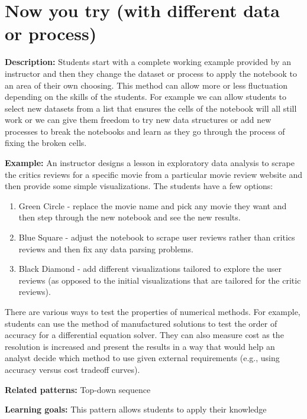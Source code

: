 \documentclass[]{book}
\providecommand{\tightlist}{%
  \setlength{\itemsep}{0pt}\setlength{\parskip}{0pt}}
\begin{document}
\section{Now you try (with different data or
process)}\label{now-you-try-with-different-data-or-process}

\textbf{Description:} Students start with a complete working example
provided by an instructor and then they change the dataset or process to
apply the notebook to an area of their own choosing. This method can
allow more or less fluctuation depending on the skills of the students.
For example we can allow students to select new datasets from a list
that ensures the cells of the notebook will all still work or we can
give them freedom to try new data structures or add new processes to
break the notebooks and learn as they go through the process of fixing
the broken cells.

\textbf{Example:} An instructor designs a lesson in exploratory data
analysis to scrape the critics reviews for a specific movie from a
particular movie review website and then provide some simple
visualizations. The students have a few options:

\begin{enumerate}
\def\labelenumi{\arabic{enumi}.}
\tightlist
\item
  Green Circle - replace the movie name and pick any movie they want and
  then step through the new notebook and see the new results.
\item
  Blue Square - adjust the notebook to scrape user reviews rather than
  critics reviews and then fix any data parsing problems.
\item
  Black Diamond - add different visualizations tailored to explore the
  user reviews (as opposed to the initial visualizations that are
  tailored for the critic reviews).
\end{enumerate}

There are various ways to test the properties of numerical methods. For
example, students can use the method of manufactured solutions to test
the order of accuracy for a differential equation solver. They can also
measure cost as the resolution is increased and present the results in a
way that would help an analyst decide which method to use given external
requirements (e.g., using accuracy versus cost tradeoff curves).

\textbf{Related patterns:} Top-down sequence

\textbf{Learning goals:} This pattern allows students to apply their
knowledge
\end{document}
